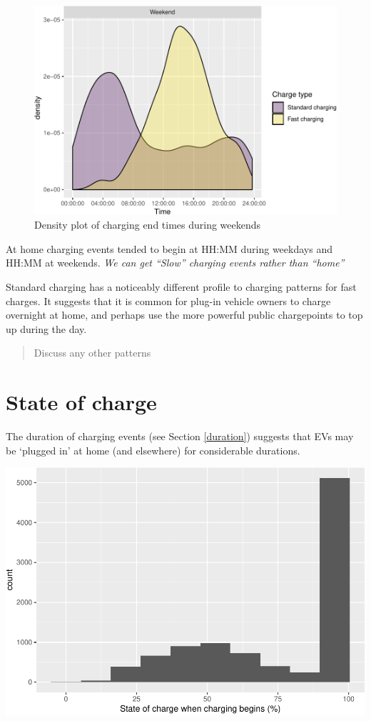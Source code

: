 \documentclass[]{article}
\begin{document}
\begin{figure}
\centering
\includegraphics{EVBB_report_files/figure-latex/chargeEndsWeekend-1.pdf}
\caption{\label{fig:chargeEndsWeekend}Density plot of charging end times
during weekends}
\end{figure}

At home charging events tended to begin at HH:MM during weekdays and
HH:MM at weekends. \emph{We can get ``Slow'' charging events rather than
``home''}

Standard charging has a noticeably different profile to charging
patterns for fast charges. It suggests that it is common for plug-in
vehicle owners to charge overnight at home, and perhaps use the more
powerful public chargepoints to top up during the day.

\begin{quote}
Discuss any other patterns
\end{quote}

\section{State of charge}\label{state-of-charge}

The duration of charging events (see Section \ref{duration}) suggests
that EVs may be `plugged in' at home (and elsewhere) for considerable
durations.

\includegraphics{EVBB_report_files/figure-latex/value of state of charge at beginning of charge-1.pdf}
\end{document}
